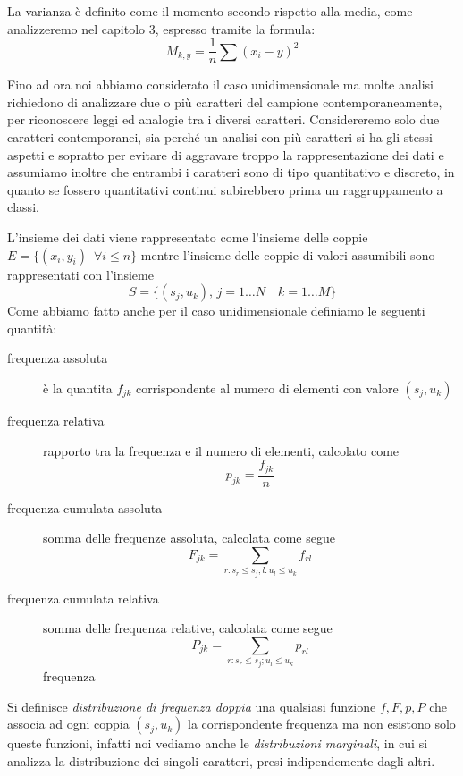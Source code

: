 \documentclass[a4paper,12pt, oneside]{book}
\begin{document}
La varianza è definito come il momento secondo rispetto alla media, come analizzeremo nel capitolo 3,
espresso tramite la formula:
\[ M_{k,y}=\frac{1}{n}\sum (x_i-y)^2 \]

Fino ad ora noi abbiamo considerato il caso unidimensionale ma molte analisi richiedono di analizzare
due o più caratteri del campione contemporaneamente, per riconoscere leggi ed analogie tra i diversi caratteri.\newline
Considereremo solo due caratteri contemporanei, sia perché un analisi con più caratteri si ha gli stessi
aspetti e sopratto per evitare di aggravare troppo la rappresentazione dei dati e assumiamo inoltre che 
entrambi i caratteri sono di tipo quantitativo e discreto, in quanto se fossero quantitativi continui
subirebbero prima un raggruppamento a classi.

L'insieme dei dati viene rappresentato come l'insieme delle coppie $E = \{(x_i, y_i) \,\,\,\forall i \leq n\}$
mentre l'insieme delle coppie di valori assumibili sono rappresentati con l'insieme
\[ S = \{(s_j, u_k), \, j = 1 \dots N \quad k = 1 \dots M\} \]
Come abbiamo fatto anche per il caso unidimensionale definiamo le seguenti quantità:
\begin{description}
    \item [frequenza assoluta ] è la quantita $f_{jk}$ corrispondente al numero di elementi con valore $(s_j, u_k)$
    \item [frequenza relativa] rapporto tra la frequenza e il numero di elementi, calcolato come 
          \[ p_{jk} = \frac{f_{jk}}{n} \]
    \item [frequenza cumulata assoluta] somma delle frequenze assoluta, calcolata come segue
           \[ F_{jk} = \sum _{r:s_r \leq s_j; l:u_l \leq u_k} f_{rl} \]
    \item [frequenza cumulata relativa] somma delle frequenza relative, calcolata come segue
           \[ P_{jk} = \sum _{r:s_r \leq s_j; u_l \leq u_k} p_{rl} \] frequenza 
\end{description}
Si definisce \emph{distribuzione di frequenza doppia} una qualsiasi funzione $f, F, p, P$ 
che associa ad ogni coppia $(s_j, u_k)$ la corrispondente frequenza ma non esistono solo queste funzioni,
infatti noi vediamo anche le \emph{distribuzioni marginali}, in cui si analizza la distribuzione dei singoli caratteri,
presi indipendemente dagli altri.
\end{document}
